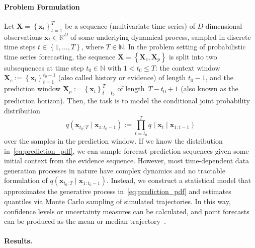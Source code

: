 \paragraph{Problem Formulation}
Let $\boldsymbol{X} = \left\{ \mathbf{x}_t \right\}_{t=1}^T$ be a sequence (multivariate time series) of $D$-dimensional observations $\mathbf{x}_t \in \mathbb{R}^D$ of some underlying dynamical process, sampled in discrete time steps $t \in \left\{1, \dots, T\right\}$, where $T \in \mathbb{N}$. In the problem setting of probabilistic time series forecasting, the sequence $\boldsymbol{X} = \left\{ \boldsymbol{X}_c, \boldsymbol{X}_p \right\}$ is split into two subsequences at time step $t_0 \in \mathbb{N}$ with $1 < t_0 \leq T$: the context window $\boldsymbol{X}_c := \left\{ \mathbf{x}_t \right\}_{t=1}^{t_0-1}$ (also called history or evidence) of length $t_0-1$, and the prediction window $\boldsymbol{X}_p := \left\{ \mathbf{x}_t \right\}_{t=t_0}^{T}$ of length~$T - t_0 + 1$ (also known as the prediction horizon). Then, the task is to model the conditional joint probability distribution
\begin{equation} \label{eq:prediction_pdf}
    q{\left( \mathbf{x}_{t_0:T} \mid \mathbf{x}_{1:t_0-1} \right)} := \prod_{t=t_0}^T{q{\left( \mathbf{x}_t \mid \mathbf{x}_{1:t-1} \right)}}
\end{equation}
over the samples in the prediction window. If we know the distribution in~\eqref{eq:prediction_pdf}, we can sample forecast prediction sequences given some initial context from the evidence sequence. However, most time-dependent data generation processes in nature have complex dynamics and no tractable formulation of $q{\left( \mathbf{x}_{t_0:T} \mid \mathbf{x}_{1:t_0-1} \right)}$. Instead, we construct a statistical model that approximates the generative process in~\eqref{eq:prediction_pdf} and estimates quantiles via Monte Carlo sampling of simulated trajectories. In this way, confidence levels or uncertainty measures can be calculated, and point forecasts can be produced as the mean or median trajectory~\cite{hyndman2008forecasting}.

\paragraph{Results.}

